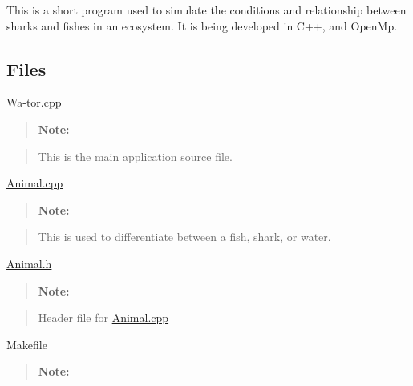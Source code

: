This is a short program used to simulate the conditions and relationship between sharks and fishes in an ecosystem. It is being developed in C++, and Open\+Mp. 



\subsection*{Files }

Wa-\/tor.\+cpp

\begin{quote}
{\bfseries Note\+:} \end{quote}


\begin{quote}

\begin{DoxyItemize}
\item This is the main application source file. 
\end{DoxyItemize}\end{quote}


\hyperlink{_animal_8cpp}{Animal.\+cpp}

\begin{quote}
{\bfseries Note\+:} \end{quote}


\begin{quote}

\begin{DoxyItemize}
\item This is used to differentiate between a fish, shark, or water. 
\end{DoxyItemize}\end{quote}


\hyperlink{_animal_8h}{Animal.\+h}

\begin{quote}
{\bfseries Note\+:} \end{quote}


\begin{quote}

\begin{DoxyItemize}
\item Header file for \hyperlink{_animal_8cpp}{Animal.\+cpp} 
\end{DoxyItemize}\end{quote}


Makefile

\begin{quote}
{\bfseries Note\+:} \end{quote}


